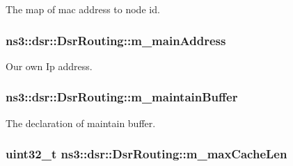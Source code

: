 The map of mac address to node id. 

\subsubsection[{\texorpdfstring{m\+\_\+main\+Address}{m_mainAddress}}]{ ns3\+::dsr\+::\+Dsr\+Routing\+::m\+\_\+main\+Address\hspace{0.3cm}{\ttfamily [private]}}\hypertarget{classns3_1_1dsr_1_1DsrRouting_a73182b5edee2d8460f28855e058fc9a0}{}\label{classns3_1_1dsr_1_1DsrRouting_a73182b5edee2d8460f28855e058fc9a0}


Our own Ip address. 

\subsubsection[{\texorpdfstring{m\+\_\+maintain\+Buffer}{m_maintainBuffer}}]{ ns3\+::dsr\+::\+Dsr\+Routing\+::m\+\_\+maintain\+Buffer\hspace{0.3cm}{\ttfamily [private]}}\hypertarget{classns3_1_1dsr_1_1DsrRouting_ac9d28a64437fbe20a4228c9811f9fc27}{}\label{classns3_1_1dsr_1_1DsrRouting_ac9d28a64437fbe20a4228c9811f9fc27}


The declaration of maintain buffer. 

\subsubsection[{\texorpdfstring{m\+\_\+max\+Cache\+Len}{m_maxCacheLen}}]{\setlength{\rightskip}{0pt plus 5cm}uint32\+\_\+t ns3\+::dsr\+::\+Dsr\+Routing\+::m\+\_\+max\+Cache\+Len\hspace{0.3cm}{\ttfamily [private]}}\hypertarget{classns3_1_1dsr_1_1DsrRouting_afce2c0909aecc7dfe4528f7f6b042019}{}\label{classns3_1_1dsr_1_1DsrRouting_afce2c0909aecc7dfe4528f7f6b042019}


